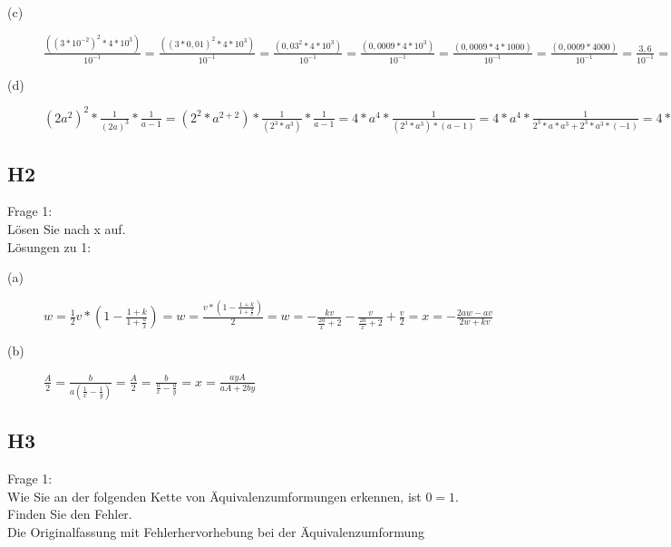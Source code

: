 \documentclass[12pt,a4paper]{article}
\begin{document}
\begin{description}
\item[(c)]{$\frac{((3 * 10^{-2})^2 * 4 * 10^3)}{10^{-1}} = \frac{((3 * 0,01)^2 * 4 * 10^3)}{10^{-1}} = \frac{(0,03^2 * 4 * 10^3)}{10^{-1}} = \frac{(0,0009 * 4 * 10^3)}{10^{-1}} = \frac{(0,0009 * 4 * 1000)}{10^{-1}} = \frac{(0,0009 * 4000)}{10^{-1}} = \frac{3,6}{10^{-1}} = \frac{3,6}{0,1} = 36$}
\item[(d)]{$(2a^2)^2 * \frac{1}{(2a)^3} * \frac{1}{a - 1} = (2^2 * a^{2 + 2}) * \frac{1}{(2^3 * a^3)} * \frac{1}{a - 1} = 4 * a^4 * \frac{1}{(2^3 * a^3) * (a - 1)} = 4 * a^4 * \frac{1}{2^3 * a * a^3 + 2^3 * a^3 * (-1)} = 4 * a^4 * \frac{1}{2^3 * a^4 - 2^3 * a^3} = \frac{4 * a^4}{2^3 * a^4 - 2^3 * a^3} = \frac{4a}{8a - 8} = \frac{a}{2a - 2}$}
\end{description}

\subsection{H2}

Frage 1:
\\[2ex]
Lösen Sie nach x auf.
\\[2ex]
Lösungen zu 1:

\begin{description}
\item[(a)]{$w = \frac{1}{2} v * (1 - \frac{1 + k}{1 + \frac{a}{x}}) = w = \frac{v * (1 - \frac{1 + k}{1 + \frac{a}{x}})}{2} = w = - \frac{kv}{\frac{2a}{x} + 2} - \frac{v}{\frac{2a}{x} + 2} + \frac{v}{2} = x = - \frac{2aw - av}{2w + kv}$}
\item[(b)]{$\frac{A}{2} = \frac{b}{a(\frac{1}{x} - \frac{1}{y})} = \frac{A}{2} = \frac{b}{\frac{a}{x} - \frac{a}{y}} = x = \frac{ayA}{aA + 2by}$}
\end{description}

\subsection{H3}

Frage 1:
\\[2ex]
Wie Sie an der folgenden Kette von Äquivalenzumformungen erkennen, ist $0 = 1$. Finden Sie den Fehler.
\\[2ex]
Die Originalfassung mit Fehlerhervorhebung bei der Äquivalenzumformung
\end{document}

